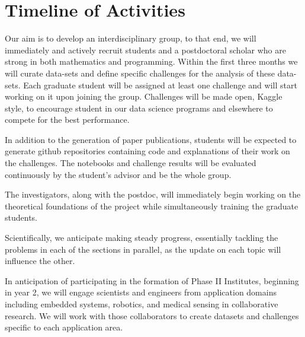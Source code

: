 \section{Timeline of Activities}

Our aim is to develop an interdisciplinary group, to that end, we will immediately and actively recruit students and a postdoctoral scholar who
are strong in both mathematics and programming. Within the first three months we will curate data-sets and define specific challenges for the analysis of these data-sets. Each graduate student will be assigned at least one challenge and will start working on it upon joining the group. Challenges will be made open, Kaggle style, to encourage student in our data science programs and elsewhere to compete for the best performance.

In addition to the generation of paper publications, students will be expected to generate github repositories containing code and explanations of
their work on the challenges. The notebooks and challenge results will be evaluated continuously by the student's advisor and be the whole group. 

The investigators, along with the postdoc, will immediately begin working on the theoretical foundations of the project while simultaneously training the graduate students. 

Scientifically, we anticipate making steady progress, essentially tackling the problems in each of the sections in parallel, as the update on each topic will influence the other. 

In anticipation of participating in the formation of Phase II Institutes, beginning in year 2, we will engage scientists and engineers from application domains including embedded systems, robotics, and medical sensing in collaborative research. We will work with those collaborators to create datasets and challenges specific to each application area.